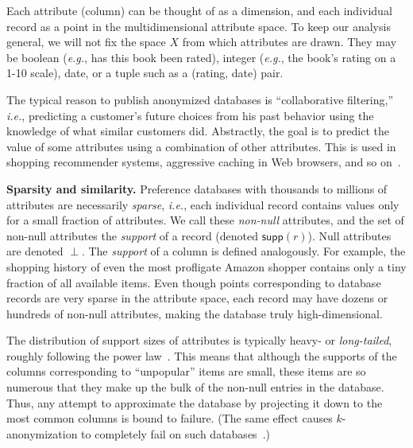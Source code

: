 \documentclass[11pt]{article}
\newcommand{\ie}{\emph{i.e.}}
\newcommand{\eg}{\emph{e.g.}}
\newcommand{\supp}{\textsf{supp}}
\begin{document}
Each attribute (column) can be thought of as a dimension, and each
individual record as a point in the multidimensional attribute space.
To keep our analysis general, we will not fix the space $X$ from which
attributes are drawn.  They may be boolean (\eg, has this book been
rated), integer (\eg, the book's rating on a 1-10 scale), date, or a
tuple such as a (rating, date) pair.


The typical reason to publish anonymized databases is ``collaborative
filtering,'' \ie, predicting a customer's future choices from his past
behavior using the knowledge of what similar customers did.  Abstractly,
the goal is to predict the value of some attributes using a combination
of other attributes.  This is used in shopping recommender systems,
aggressive caching in Web browsers, and so on~\cite{collab}.



\vspace{1ex}
\noindent
\textbf{Sparsity and similarity.}
\label{sparsity}
Preference databases with thousands to millions of attributes are
necessarily \emph{sparse}, \ie, each individual record contains values
only for a small fraction of attributes.  We call these \emph{non-null}
attributes, and the set of non-null attributes the \emph{support} of
a record (denoted $\supp(r)$).  Null attributes are denoted $\perp$.
The \emph{support} of a column is defined analogously.  For example, the
shopping history of even the most profligate Amazon shopper contains only
a tiny fraction of all available items.  Even though points corresponding
to database records are very sparse in the attribute space, each record
may have dozens or hundreds of non-null attributes, making the database
truly high-dimensional.

The distribution of support sizes of attributes is typically heavy- or
\emph{long-tailed}, roughly following the power law~\cite{bryn,longtail}.
This means that although the supports of the columns corresponding to
``unpopular'' items are small, these items are so numerous that they make
up the bulk of the non-null entries in the database.  Thus, any attempt
to approximate the database by projecting it down to the most common
columns is bound to failure.  (The same effect causes $k$-anonymization
to completely fail on such databases~\cite{curse}.)
\end{document}
